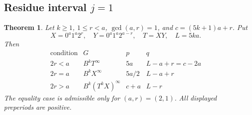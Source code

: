 \documentclass[11pt]{article}
\newtheorem{theorem}{Theorem}[section]
\theoremstyle{remark}\newtheorem{remark}[theorem]{Remark}
\newcommand{\per}{^{\infty}}
\begin{document}
\subsection{Residue interval \texorpdfstring{$j=1$}{j=1}}
\begin{theorem}\label{thm:first}
Let $k\ge1$, $1\le r<a$, $\gcd(a,r)=1$, and $c=(5k+1)a+r$. Put
\[X=0^a1^a2^r,\quad Y=0^a1^a2^{a-r},\quad T=XY,\quad L=5ka.\]
Then
\[
\begin{array}{c|c|c|c}
\text{condition}&G&p&q\\\hline
2r<a&B^kT\per&5a&L-a+r=c-2a\\
2r=a&B^kX\per&5a/2&L-a+r\\
2r>a&B^k(T^kX)\per&c+a&L-r
\end{array}
\]
The equality case is admissible only for $(a,r)=(2,1)$. All displayed preperiods are positive.
\end{theorem}
\end{document}
